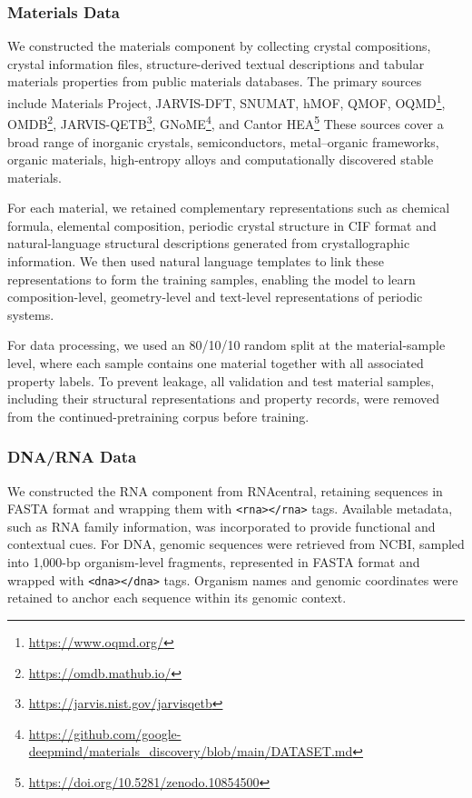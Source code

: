 \subsubsection{Materials Data}

We constructed the materials component by collecting crystal compositions, crystal information files, structure-derived textual descriptions and tabular materials properties from public materials databases. The primary sources include 
Materials Project, JARVIS-DFT, SNUMAT, hMOF, QMOF,
OQMD\footnote{\url{https://www.oqmd.org/}},
OMDB\footnote{\url{https://omdb.mathub.io/}},
JARVIS-QETB\footnote{\url{https://jarvis.nist.gov/jarvisqetb}},
GNoME\footnote{\url{https://github.com/google-deepmind/materials_discovery/blob/main/DATASET.md}}, and Cantor HEA\footnote{\url{https://doi.org/10.5281/zenodo.10854500}}
These sources cover a broad range of inorganic crystals, semiconductors, metal--organic frameworks, organic materials, high-entropy alloys and computationally discovered stable materials.
 
For each material, we retained complementary representations such as chemical formula, elemental composition, periodic crystal structure in CIF format and natural-language structural descriptions generated from crystallographic information. We then used natural language templates to link these representations to form the training samples, enabling the model to learn composition-level, geometry-level and text-level representations of periodic systems. 

For data processing, we used an 80/10/10 random split at the material-sample level, where each sample contains one material together with all associated property labels. To prevent leakage, all validation and test material samples, including their structural representations and property records, were removed from the continued-pretraining corpus before training.


\subsubsection{DNA/RNA Data}
We constructed the RNA component from RNAcentral, retaining sequences in FASTA format and wrapping them with \verb|<rna></rna>| tags. Available metadata, such as RNA family information, was incorporated to provide functional and contextual cues. 
For DNA, genomic sequences were retrieved from NCBI, sampled into 1,000-bp organism-level fragments, represented in FASTA format and wrapped with \verb|<dna></dna>| tags. Organism names and genomic coordinates were retained to anchor each sequence within its genomic context.


